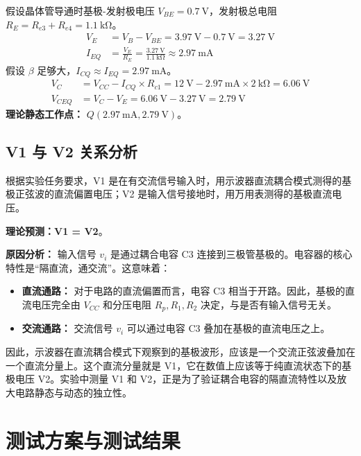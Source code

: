 \documentclass[UTF8]{ctexrep} %
\begin{document}
假设晶体管导通时基极-发射极电压 $V_{BE} = \SI{0.7}{\volt}$，发射极总电阻 $R_E = R_{e3} + R_{e4} = \SI{1.1}{\kilo\ohm}$。
\begin{align*}
    V_E &= V_B - V_{BE} = \SI{3.97}{\volt} - \SI{0.7}{\volt} = \SI{3.27}{\volt} \\
    I_{EQ} &= \frac{V_E}{R_E} = \frac{\SI{3.27}{\volt}}{\SI{1.1}{\kilo\ohm}} \approx \SI{2.97}{\milli\ampere}
\end{align*}
假设 $\beta$ 足够大，$I_{CQ} \approx I_{EQ} = \SI{2.97}{\milli\ampere}$。
\begin{align*}
    V_C &= V_{CC} - I_{CQ} \times R_{c1} = \SI{12}{\volt} - \SI{2.97}{\milli\ampere} \times \SI{2}{\kilo\ohm} = \SI{6.06}{\volt} \\
    V_{CEQ} &= V_C - V_E = \SI{6.06}{\volt} - \SI{3.27}{\volt} = \SI{2.79}{\volt}
\end{align*}
\textbf{理论静态工作点：} $Q(\SI{2.97}{\milli\ampere}, \SI{2.79}{\volt})$。

\subsection{V1 与 V2 关系分析}
根据实验任务要求，V1 是在有交流信号输入时，用示波器直流耦合模式测得的基极正弦波的直流偏置电压；V2 是输入信号接地时，用万用表测得的基极直流电压。

\textbf{理论预测：V1 = V2}。

\textbf{原因分析：}
输入信号 $v_i$ 是通过耦合电容 C3 连接到三极管基极的。电容器的核心特性是“隔直流，通交流”。这意味着：
\begin{itemize}
    \item \textbf{直流通路：} 对于电路的直流偏置而言，电容 C3 相当于开路。因此，基极的直流电压完全由 $V_{CC}$ 和分压电阻 $R_p, R_1, R_2$ 决定，与是否有输入信号无关。
    \item \textbf{交流通路：} 交流信号 $v_i$ 可以通过电容 C3 叠加在基极的直流电压之上。
\end{itemize}
因此，示波器在直流耦合模式下观察到的基极波形，应该是一个交流正弦波叠加在一个直流分量上。这个直流分量就是 V1，它在数值上应该等于纯直流状态下的基极电压 V2。实验中测量 V1 和 V2，正是为了验证耦合电容的隔直流特性以及放大电路静态与动态的独立性。


\section{测试方案与测试结果}
\label{sec:exp1_test}


\end{document}
